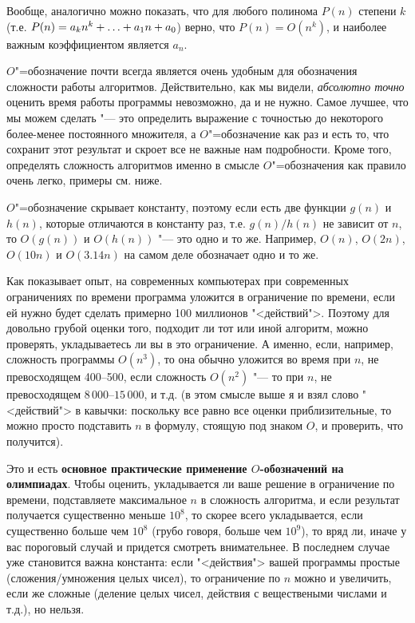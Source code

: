 {Вообще, аналогично можно показать, что для любого полинома $P(n)$ степени $k$ (т.е. 
$P(n)\hm=a_kn^k\hm+\dots\hm+a_1n+a_0$) верно, что $P(n)=O(n^k)$, и наиболее важным коэффициентом 
является $a_n$.

$O$"=обозначение почти всегда является очень удобным для обозначения сложности работы алгоритмов. 
Действительно, как мы видели, \textit{абсолютно точно} оценить время работы программы 
невозможно, да и не нужно. Самое лучшее, что мы можем сделать "--- это определить выражение с 
точностью до некоторого более-менее постоянного множителя, а $O$"=обозначение как раз и есть 
то, что сохранит этот результат и скроет все не важные нам подробности. Кроме того, определять 
сложность алгоритмов именно в смысле $O$"=обозначения как правило очень легко, примеры см. 
ниже.

$O$"=обозначение скрывает константу, поэтому если есть две функции $g(n)$ и $h(n)$, которые 
отличаются в константу раз, т.е. $g(n)/h(n)$ не зависит от $n$, то $O(g(n))$ и 
$O(h(n))$ "--- это одно и то же. Например, $O(n)$, $O(2n)$, $O(10n)$ и 
$O(3.14n)$ на самом деле обозначает одно и то же.

Как показывает опыт, на 
современных компьютерах при современных ограничениях по времени программа уложится в 
ограничение по времени, если ей нужно будет сделать примерно 100 миллионов "<действий">. 
Поэтому для довольно грубой оценки того, подходит ли тот или иной алгоритм, можно проверять, 
укладываетесь ли вы в это ограничение. А именно, если, например, сложность программы $O(n^3)$, 
то она обычно уложится во время при $n$, не превосходящем 400--500, если сложность $O(n^2)$ 
"--- то при $n$, не превосходящем $8\,000$--$15\,000$, и т.д. (в этом смысле выше я и взял 
слово "<действий"> в кавычки: поскольку все равно все оценки приблизительные, то можно просто 
подставить $n$ в формулу, стоящую под знаком $O$, и проверить, что получится).

Это и есть \textbf{основное практические применение $O$-обозначений на олимпиадах}. Чтобы оценить, 
укладывается ли ваше решение в ограничение по времени, подставляете максимальное $n$ в сложность 
алгоритма, и если результат получается существенно меньше $10^8$, то скорее всего укладывается, если 
существенно больше чем $10^8$ (грубо говоря, больше чем $10^9$), то вряд ли, иначе у вас пороговый 
случай и придется смотреть внимательнее. В последнем случае уже становится важна константа: если 
"<действия"> вашей программы простые (сложения/умножения целых чисел), то ограничение по $n$ можно 
и увеличить, если же сложные (деление целых чисел, действия с веществеными числами и т.д.), но 
нельзя.

}
